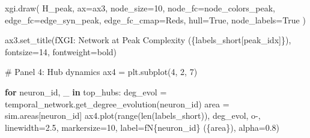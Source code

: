 \documentclass[
  11pt,
  letterpaper,
  oneside,
  openany]{book}
\newenvironment{Shaded}{\begin{snugshade}}{\end{snugshade}}
\newcommand{\BuiltInTok}[1]{\textcolor[rgb]{0.00,0.23,0.31}{#1}}
\newcommand{\CommentTok}[1]{\textcolor[rgb]{0.37,0.37,0.37}{#1}}
\newcommand{\ControlFlowTok}[1]{\textcolor[rgb]{0.00,0.23,0.31}{\textbf{#1}}}
\newcommand{\DecValTok}[1]{\textcolor[rgb]{0.68,0.00,0.00}{#1}}
\newcommand{\FloatTok}[1]{\textcolor[rgb]{0.68,0.00,0.00}{#1}}
\newcommand{\KeywordTok}[1]{\textcolor[rgb]{0.00,0.23,0.31}{\textbf{#1}}}
\newcommand{\NormalTok}[1]{\textcolor[rgb]{0.00,0.23,0.31}{#1}}
\newcommand{\OperatorTok}[1]{\textcolor[rgb]{0.37,0.37,0.37}{#1}}
\newcommand{\SpecialCharTok}[1]{\textcolor[rgb]{0.37,0.37,0.37}{#1}}
\newcommand{\SpecialStringTok}[1]{\textcolor[rgb]{0.13,0.47,0.30}{#1}}
\newcommand{\StringTok}[1]{\textcolor[rgb]{0.13,0.47,0.30}{#1}}
\newcommand{\VariableTok}[1]{\textcolor[rgb]{0.07,0.07,0.07}{#1}}
\begin{document}
\begin{Shaded}
\begin{Highlighting}[]
\NormalTok{    xgi.draw(}
\NormalTok{        H\_peak,}
\NormalTok{        ax}\OperatorTok{=}\NormalTok{ax3,}
\NormalTok{        node\_size}\OperatorTok{=}\DecValTok{10}\NormalTok{,}
\NormalTok{        node\_fc}\OperatorTok{=}\NormalTok{node\_colors\_peak,}
\NormalTok{        edge\_fc}\OperatorTok{=}\NormalTok{edge\_syn\_peak,}
\NormalTok{        edge\_fc\_cmap}\OperatorTok{=}\StringTok{\textquotesingle{}Reds\textquotesingle{}}\NormalTok{,}
\NormalTok{        hull}\OperatorTok{=}\VariableTok{True}\NormalTok{,}
\NormalTok{        node\_labels}\OperatorTok{=}\VariableTok{True}
\NormalTok{    )}

\NormalTok{ax3.set\_title(}\SpecialStringTok{f\textquotesingle{}XGI: Network at Peak Complexity (}\SpecialCharTok{\{}\NormalTok{labels\_short[peak\_idx]}\SpecialCharTok{\}}\SpecialStringTok{)\textquotesingle{}}\NormalTok{, }
\NormalTok{             fontsize}\OperatorTok{=}\DecValTok{14}\NormalTok{, fontweight}\OperatorTok{=}\StringTok{\textquotesingle{}bold\textquotesingle{}}\NormalTok{)}

\CommentTok{\# Panel 4: Hub dynamics}
\NormalTok{ax4 }\OperatorTok{=}\NormalTok{ plt.subplot(}\DecValTok{4}\NormalTok{, }\DecValTok{2}\NormalTok{, }\DecValTok{7}\NormalTok{)}

\ControlFlowTok{for}\NormalTok{ neuron\_id, \_ }\KeywordTok{in}\NormalTok{ top\_hubs:}
\NormalTok{    deg\_evol }\OperatorTok{=}\NormalTok{ temporal\_network.get\_degree\_evolution(neuron\_id)}
\NormalTok{    area }\OperatorTok{=}\NormalTok{ sim.areas[neuron\_id]}
\NormalTok{    ax4.plot(}\BuiltInTok{range}\NormalTok{(}\BuiltInTok{len}\NormalTok{(labels\_short)), deg\_evol, }\StringTok{\textquotesingle{}o{-}\textquotesingle{}}\NormalTok{, linewidth}\OperatorTok{=}\FloatTok{2.5}\NormalTok{,}
\NormalTok{            markersize}\OperatorTok{=}\DecValTok{10}\NormalTok{, label}\OperatorTok{=}\SpecialStringTok{f\textquotesingle{}N}\SpecialCharTok{\{}\NormalTok{neuron\_id}\SpecialCharTok{\}}\SpecialStringTok{ (}\SpecialCharTok{\{}\NormalTok{area}\SpecialCharTok{\}}\SpecialStringTok{)\textquotesingle{}}\NormalTok{, alpha}\OperatorTok{=}\FloatTok{0.8}\NormalTok{)}


\end{Highlighting}
\end{Shaded}
\end{document}
